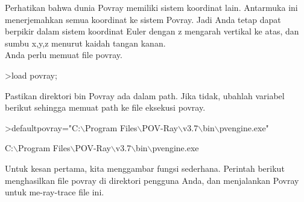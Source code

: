 \documentclass[a4paper,10pt]{article}
\begin{document}
\begin{eulernotebook}
\begin{eulercomment}
Perhatikan bahwa dunia Povray memiliki sistem koordinat lain. Antarmuka ini menerjemahkan semua koordinat ke sistem
Povray. Jadi Anda tetap dapat berpikir dalam sistem koordinat Euler dengan z mengarah vertikal ke atas, dan sumbu
x,y,z menurut kaidah tangan kanan.\\
Anda perlu memuat file povray.
\end{eulercomment}
\begin{eulerprompt}
>load povray;
\end{eulerprompt}
\begin{eulercomment}
Pastikan direktori bin Povray ada dalam path. Jika tidak, ubahlah variabel berikut sehingga memuat path ke file
eksekusi povray.
\end{eulercomment}
\begin{eulerprompt}
>defaultpovray="C:\(\backslash\)Program Files\(\backslash\)POV-Ray\(\backslash\)v3.7\(\backslash\)bin\(\backslash\)pvengine.exe"
\end{eulerprompt}
\begin{euleroutput}
  C:\(\backslash\)Program Files\(\backslash\)POV-Ray\(\backslash\)v3.7\(\backslash\)bin\(\backslash\)pvengine.exe
\end{euleroutput}
\begin{eulercomment}
Untuk kesan pertama, kita menggambar fungsi sederhana. Perintah berikut menghasilkan file povray di direktori
pengguna Anda, dan menjalankan Povray untuk me-ray-trace file ini.


\end{eulercomment}
\end{eulernotebook}
\end{document}
